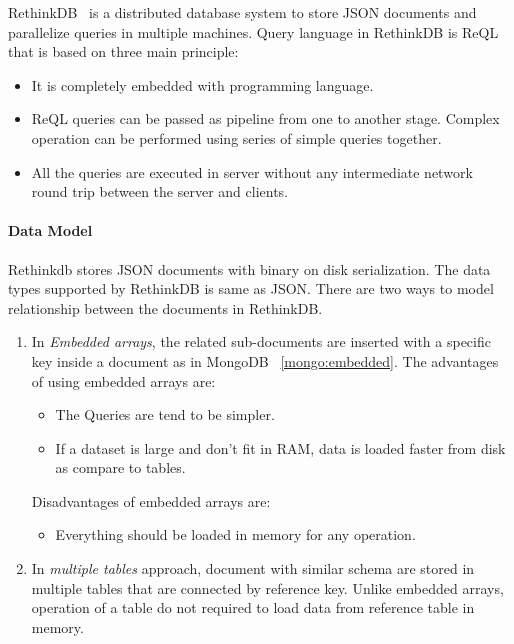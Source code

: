 RethinkDB~\citep{rethinkdb} is a distributed database system to store  JSON documents and
 parallelize queries in multiple machines. Query language in RethinkDB is ReQL  that is based on three main principle:
 \begin{itemize}
 \item  It is completely embedded with programming language.
 \item ReQL queries can be passed as pipeline from one to another stage. Complex operation can be performed using series of simple queries together. 
 \item All the queries are executed in server without any intermediate network round trip between the server and clients.
 \end{itemize}
  
\paragraph{Data Model}
Rethinkdb stores JSON documents with binary on disk serialization. The data types supported by RethinkDB is same as JSON. 
There are two ways to model relationship between the documents in RethinkDB. 
\begin{enumerate}
	\item 
		In \textit{Embedded arrays}, the related sub-documents are inserted with a specific key inside a document as in MongoDB ~\ref{mongo:embedded}. The advantages of using embedded arrays are:
		\begin{itemize}
			\item The Queries are tend to be simpler. 
			\item If a dataset is large and don't fit in RAM, data is loaded faster from disk as compare to tables. 
		\end{itemize}
		Disadvantages of embedded arrays are: 
		\begin{itemize}
			\item Everything should be loaded in memory for any operation. 
		\end{itemize}
		
	\item 
	In \textit{multiple tables} approach, document with similar schema are stored in multiple tables that are connected by reference key. Unlike embedded arrays, operation of a table do not required to load data from reference table in memory.
\end{enumerate}

